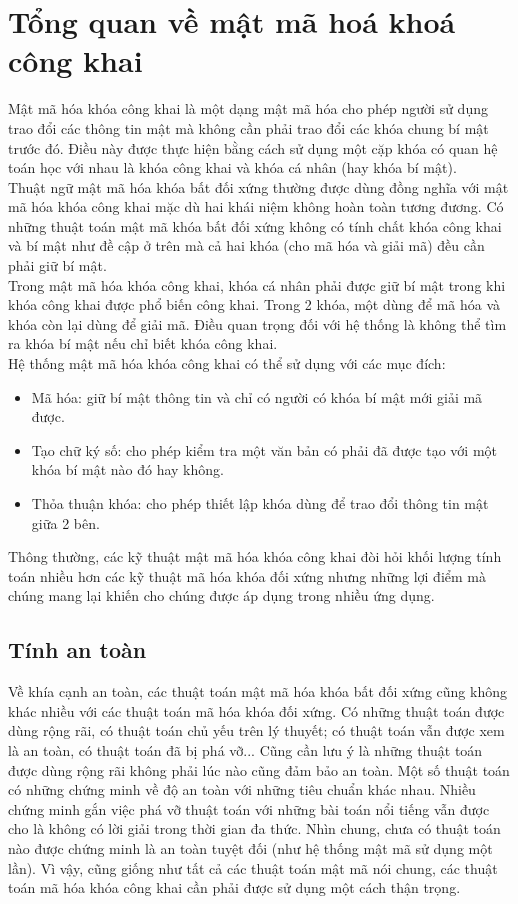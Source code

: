 \section{Tổng quan về mật mã hoá khoá công khai}

Mật mã hóa khóa công khai là một dạng mật mã hóa cho phép người sử dụng trao đổi các thông tin mật mà không cần phải trao đổi các khóa chung bí mật trước đó. Điều này được thực hiện bằng cách sử dụng một cặp khóa có quan hệ toán học với nhau là khóa công khai và khóa cá nhân (hay khóa bí mật).\\

Thuật ngữ mật mã hóa khóa bất đối xứng thường được dùng đồng nghĩa với mật mã hóa khóa công khai mặc dù hai khái niệm không hoàn toàn tương đương. Có những thuật toán mật mã khóa bất đối xứng không có tính chất khóa công khai và bí mật như đề cập ở trên mà cả hai khóa (cho mã hóa và giải mã) đều cần phải giữ bí mật.\\

Trong mật mã hóa khóa công khai, khóa cá nhân phải được giữ bí mật trong khi khóa công khai được phổ biến công khai. Trong 2 khóa, một dùng để mã hóa và khóa còn lại dùng để giải mã. Điều quan trọng đối với hệ thống là không thể tìm ra khóa bí mật nếu chỉ biết khóa công khai.\\

Hệ thống mật mã hóa khóa công khai có thể sử dụng với các mục đích:
\begin{itemize}
    \item Mã hóa: giữ bí mật thông tin và chỉ có người có khóa bí mật mới giải mã được.
    \item Tạo chữ ký số: cho phép kiểm tra một văn bản có phải đã được tạo với một khóa bí mật nào đó hay không.
    \item Thỏa thuận khóa: cho phép thiết lập khóa dùng để trao đổi thông tin mật giữa 2 bên.
\end{itemize}

Thông thường, các kỹ thuật mật mã hóa khóa công khai đòi hỏi khối lượng tính toán nhiều hơn các kỹ thuật mã hóa khóa đối xứng nhưng những lợi điểm mà chúng mang lại khiến cho chúng được áp dụng trong nhiều ứng dụng.

\subsection{Tính an toàn}

Về khía cạnh an toàn, các thuật toán mật mã hóa khóa bất đối xứng cũng không khác nhiều với các thuật toán mã hóa khóa đối xứng. Có những thuật toán được dùng rộng rãi, có thuật toán chủ yếu trên lý thuyết; có thuật toán vẫn được xem là an toàn, có thuật toán đã bị phá vỡ... Cũng cần lưu ý là những thuật toán được dùng rộng rãi không phải lúc nào cũng đảm bảo an toàn. Một số thuật toán có những chứng minh về độ an toàn với những tiêu chuẩn khác nhau. Nhiều chứng minh gắn việc phá vỡ thuật toán với những bài toán nổi tiếng vẫn được cho là không có lời giải trong thời gian đa thức. Nhìn chung, chưa có thuật toán nào được chứng minh là an toàn tuyệt đối (như hệ thống mật mã sử dụng một lần). Vì vậy, cũng giống như tất cả các thuật toán mật mã nói chung, các thuật toán mã hóa khóa công khai cần phải được sử dụng một cách thận trọng.

